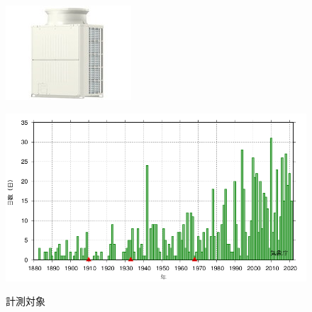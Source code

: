 \documentclass[a4j,fleqn,dvipdfmx,uplatex]{jsarticle}
\begin{document}
\begin{figure}[hhtb]
  \centering
    \begin{minipage}[b]{0.45\linewidth}
      \centering
      \includegraphics[width=\linewidth]{img/PUHY-EP335DMG9.jpg}
      \label{subfig:condensing_unit}
    \end{minipage}
    \begin{minipage}[b]{0.45\linewidth}
      \centering
      \includegraphics[width=\linewidth]{img/OSAKA_tmaxGE35.png}
      \label{subfig:unit_cooler}
    \end{minipage}
  \caption{計測対象}
  \label{fig2:hard}
\end{figure}
\end{document}

